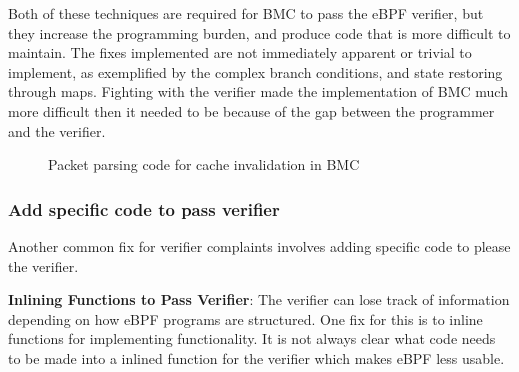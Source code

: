 
Both of these techniques are required for BMC to pass the eBPF verifier, but they
    increase the programming burden, and produce code that is more difficult
    to maintain.
The fixes implemented are not immediately apparent or trivial to implement, as
    exemplified by the complex branch conditions, and state restoring through maps.
Fighting with the verifier made the implementation of BMC much more difficult then
    it needed to be because of the gap between the programmer and the verifier.

\begin{figure}[t]
    
    \caption{Packet parsing code for cache invalidation in BMC}
    \label{fig:bmc-code}
\end{figure}

\subsubsection{Add specific code to pass verifier}
\label{motivation:add-code}
Another common fix for verifier complaints involves adding specific code to please
    the verifier.

%

\noindent\textbf{Inlining Functions to Pass Verifier}:
The verifier can lose track of information depending on how eBPF programs are structured.
One fix for this is to inline functions for implementing functionality.
It is not always clear what code needs to be made into a inlined function for the verifier
    which makes eBPF less usable.


